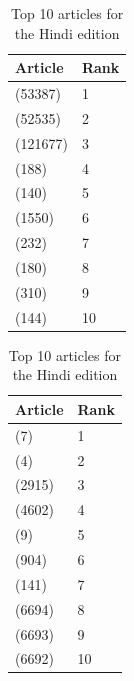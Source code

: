 \begin{table}[htbp]
    \begin{minipage}{.45\linewidth}
        \centering
        \begin{tabular}{ll}
            \toprule
            Article & Rank\\
            \midrule
            (53387) & 1\\
            (52535) & 2\\
            (121677) & 3\\
            (188) & 4\\
            (140) & 5\\
            (1550) & 6\\
            (232) & 7\\
            (180) & 8\\
            (310) & 9\\
            (144) & 10\\
            \bottomrule
        \end{tabular}
        \caption{Top 10 articles for the Hebrew edition}
    \end{minipage}
    \hfill
    \begin{minipage}{.45\linewidth}
        \centering
        \begin{tabular}{ll}
            \toprule
            Article & Rank\\
            \midrule
            (7) & 1\\
            (4) & 2\\
            (2915) & 3\\
            (4602) & 4\\
            (9) & 5\\
            (904) & 6\\
            (141) & 7\\
            (6694) & 8\\
            (6693) & 9\\
            (6692) & 10\\
            \bottomrule
        \end{tabular}
        \caption{Top 10 articles for the Hindi edition}
    \end{minipage}
\end{table}
